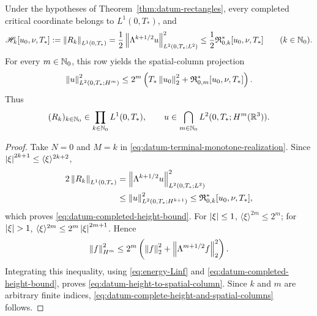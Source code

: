 \begin{corollary}
\label{cor:datum-critical-height-completion}
Under the hypotheses of Theorem~\ref{thm:datum-rectangles}, every completed
critical coordinate belongs to \(L^1(0,T_*)\), and
\begin{equation}
 \mathscr H_k[u_0,\nu,T_*]
 :=\left\lVert R_k\right\rVert_{L^1(0,T_*)}
 =\frac12\left\lVert \Lambda^{k+1/2}u\right\rVert_{L^2(0,T_*;L^2)}^2
 \le\frac12\mathfrak R_{0,k}^*[u_0,\nu,T_*]
 \qquad(k\in\mathbb N_0).
 \label{eq:datum-completed-height-bound}
\end{equation}
For every \(m\in\mathbb N_0\), this row yields the spatial-column projection
\begin{equation}
 \left\lVert u\right\rVert_{L^2(0,T_*;H^m)}^2
 \le
 2^m\left(
  T_*\left\lVert u_0\right\rVert_2^2+\mathfrak R_{0,m}^*[u_0,\nu,T_*]
 \right).
 \label{eq:datum-height-to-spatial-column}
\end{equation}
Thus
\begin{equation}
 (R_k)_{k\in\mathbb N_0}\in\prod_{k\in\mathbb N_0}L^1(0,T_*),
 \qquad
 u\in\bigcap_{m\in\mathbb N_0}L^2(0,T_*;H^m(\mathbb R^3)).
 \label{eq:datum-complete-height-and-spatial-columns}
\end{equation}
\end{corollary}

\begin{samepage}
\begin{proof}
Take \(N=0\) and \(M=k\) in
\eqref{eq:datum-terminal-monotone-realization}.  Since
\(\left|\xi\right|^{2k+1}\le\langle\xi\rangle^{2k+2}\),
\begin{align*}
 2\left\lVert R_k\right\rVert_{L^1(0,T_*)}
 &=\left\lVert \Lambda^{k+1/2}u\right\rVert_{L^2(0,T_*;L^2)}^2\\
 &\le\left\lVert u\right\rVert_{L^2(0,T_*;H^{k+1})}^2
 \le\mathfrak R_{0,k}^*[u_0,\nu,T_*],
\end{align*}
which proves \eqref{eq:datum-completed-height-bound}.  For
\(\left|\xi\right|\le1\),
\(\langle\xi\rangle^{2m}\le2^m\); for \(\abs\xi>1\),
\(\langle\xi\rangle^{2m}\le2^m\left|\xi\right|^{2m+1}\).  Hence
\[
 \left\lVert f\right\rVert_{H^m}^2
 \le2^m\left(\left\lVert f\right\rVert_2^2+
 \left\lVert \Lambda^{m+1/2}f\right\rVert_2^2\right).
\]
Integrating this inequality, using
\eqref{eq:energy-Linf} and
\eqref{eq:datum-completed-height-bound}, proves
\eqref{eq:datum-height-to-spatial-column}.  Since \(k\) and \(m\) are
arbitrary finite indices, \eqref{eq:datum-complete-height-and-spatial-columns}
follows.
\end{proof}
\end{samepage}

